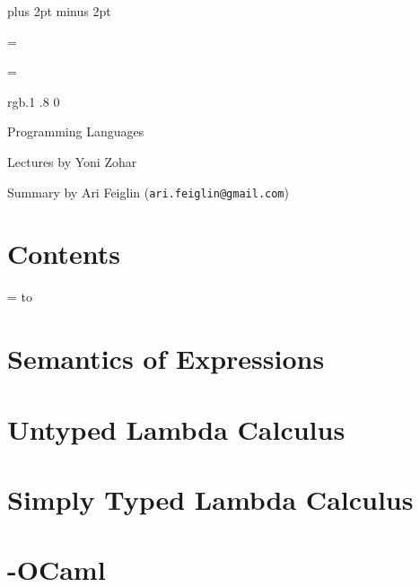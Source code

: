 


\parindent=0pt
\parskip=3pt plus 2pt minus 2pt



\footline={}


\headline={}

\color rgb{.1 .8 0}

{\def\boxshadowcolor{rgb{.2 .9 .2}}

    \centerline{Programming Languages}
    \smallskip
    \centerline{Lectures by Yoni Zohar}
    \centerline{Summary by Ari Feiglin ({\tt ari.feiglin@gmail.com})}

\eppbox

\bigskip

\section*{Contents}

\tableofcontents
\eppbox

}

\vfill\break

\color{black}

\newif\ifpageodd
\pageoddtrue
\headline={%
    \hbox to \hsize{\color{black}%
        \ifpageodd\hfil{\it\currsubsection\quad\bf\folio}\global\pageoddfalse%
        \else{\bf\folio\quad\it\currsubsection}\hfil\global\pageoddtrue\fi%
    }%
}

\section{Semantics of Expressions}



\vfill\break

\section{Untyped Lambda Calculus}



\vfill\break

\section{Simply Typed Lambda Calculus}



\vfill\break

\section{\lambda-OCaml}



\bye

